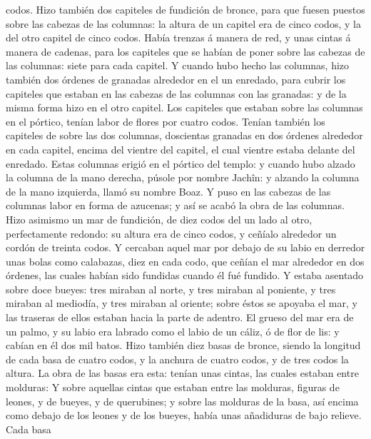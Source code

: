 codos.  Hizo también dos capiteles de fundición de bronce,
para que fuesen puestos sobre las cabezas de las columnas: la altura de
un capitel era de cinco codos, y la del otro capitel de cinco codos.
 Había trenzas á manera de red, y unas cintas á manera de
cadenas, para los capiteles que se habían de poner sobre las cabezas de
las columnas: siete para cada capitel.  Y cuando hubo hecho
las columnas, hizo también dos órdenes de granadas alrededor en el un
enredado, para cubrir los capiteles que estaban en las cabezas de las
columnas con las granadas: y de la misma forma hizo en el otro capitel.
 Los capiteles que estaban sobre las columnas en el
pórtico, tenían labor de flores por cuatro codos.  Tenían
también los capiteles de sobre las dos columnas, doscientas granadas en
dos órdenes alrededor en cada capitel, encima del vientre del capitel,
el cual vientre estaba delante del enredado.  Estas
columnas erigió en el pórtico del templo: y cuando hubo alzado la
columna de la mano derecha, púsole por nombre Jachîn: y alzando la
columna de la mano izquierda, llamó su nombre Boaz.  Y puso
en las cabezas de las columnas labor en forma de azucenas; y así se
acabó la obra de las columnas.  Hizo asimismo un mar de
fundición, de diez codos del un lado al otro, perfectamente redondo: su
altura era de cinco codos, y ceñíalo alrededor un cordón de treinta
codos.  Y cercaban aquel mar por debajo de su labio en
derredor unas bolas como calabazas, diez en cada codo, que ceñían el mar
alrededor en dos órdenes, las cuales habían sido fundidas cuando él fué
fundido.  Y estaba asentado sobre doce bueyes: tres miraban
al norte, y tres miraban al poniente, y tres miraban al mediodía, y tres
miraban al oriente; sobre éstos se apoyaba el mar, y las traseras de
ellos estaban hacia la parte de adentro.  El grueso del mar
era de un palmo, y su labio era labrado como el labio de un cáliz, ó de
flor de lis: y cabían en él dos mil batos.  Hizo también
diez basas de bronce, siendo la longitud de cada basa de cuatro codos, y
la anchura de cuatro codos, y de tres codos la altura.  La
obra de las basas era esta: tenían unas cintas, las cuales estaban entre
molduras:  Y sobre aquellas cintas que estaban entre las
molduras, figuras de leones, y de bueyes, y de querubines; y sobre las
molduras de la basa, así encima como debajo de los leones y de los
bueyes, había unas añadiduras de bajo relieve.  Cada basa
